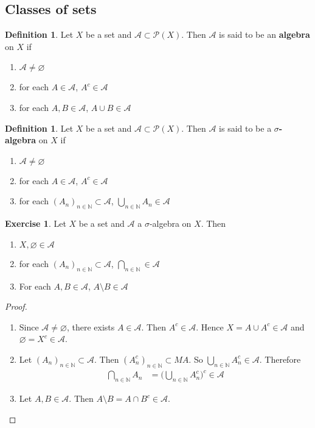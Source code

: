 \documentclass[12pt]{amsart}
\theoremstyle{definition}
\newtheorem{defn}[definition]{Definition}
\newtheorem{ex}[definition]{Exercise}
\newcommand{\sig}{\sigma}
\newcommand{\N}{\mathbb{N}}
\newcommand{\MA}{\mathcal{A}}
\newcommand{\MP}{\mathcal{P}}
\begin{document}
	\subsection{Classes of sets}
	
	\begin{defn}
		Let $X$ be a set and $\MA \subset \MP(X)$. Then $\MA$ is said to be an \textbf{algebra} on $X$ if 
		\begin{enumerate}
			\item $\MA \neq \varnothing$
			\item for each $A \in \MA$, $A^c \in \MA$
			\item for each $A,B \in \MA$, $A \cup B \in \MA$
		\end{enumerate}
	\end{defn}
	
	\begin{defn}
		Let $X$ be a set and $\MA \subset \MP(X)$. Then $\MA$ is said to be a $\sigma$\textbf{-algebra} on $X$ if 
		\begin{enumerate}
			\item $\MA \neq \varnothing$
			\item for each $A \in \MA$, $A^c \in \MA$
			\item for each $(A_n)_{n \in \N} \subset \MA$, $\bigcup\limits_{n \in \N}A_n \in \MA$
		\end{enumerate}
	\end{defn}
	
	\begin{ex}
		Let $X$ be a set and $\MA$ a $\sig$-algebra on $X$. Then 
		\begin{enumerate}
			\item $X, \varnothing \in \MA$
			\item for each $(A_n)_{n \in \N} \subset \MA$, $\bigcap\limits_{n \in \N} \in \MA$
			\item For each $A, B \in \MA$, $A \setminus B \in \MA$  
		\end{enumerate}
	\end{ex}
	
	\begin{proof}\
		\begin{enumerate}
			\item Since $\MA \neq \varnothing$, there exists $A \in \MA$. Then $A^c \in \MA$. Hence $X = A \cup A^c \in \MA$ and $\varnothing = X^c \in \MA$.
			\item Let $(A_n)_{n \in \N} \subset \MA$. Then $(A_n^c)_{n \in \N} \subset MA$. So $\bigcup\limits_{n \in \N}A_n^c \in \MA$. Therefore \begin{align*}
				\bigcap\limits_{n \in \N}A_n 
				&= \bigg(\bigcup\limits_{n \in \N}A_n^c\bigg)^c \in \MA
			\end{align*}
			\item Let $A,B \in \MA$. Then $A \setminus B = A \cap B^c \in \MA$. 
		\end{enumerate}
	\end{proof}
	
\end{document}
